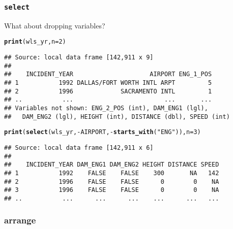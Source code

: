 \documentclass{beamer}\usepackage[]{graphicx}\usepackage[]{color}
\makeatletter
\newcommand{\hlnum}[1]{\textcolor[rgb]{0.686,0.059,0.569}{#1}}%
\newcommand{\hlstr}[1]{\textcolor[rgb]{0.192,0.494,0.8}{#1}}%
\newcommand{\hlopt}[1]{\textcolor[rgb]{0,0,0}{#1}}%
\newcommand{\hlstd}[1]{\textcolor[rgb]{0.345,0.345,0.345}{#1}}%
\newcommand{\hlkwc}[1]{\textcolor[rgb]{0.333,0.667,0.333}{#1}}%
\newcommand{\hlkwd}[1]{\textcolor[rgb]{0.737,0.353,0.396}{\textbf{#1}}}%
\newenvironment{kframe}{%
 \def\at@end@of@kframe{}%
 \ifinner\ifhmode%
  \def\at@end@of@kframe{\end{minipage}}%
  \begin{minipage}{\columnwidth}%
 \fi\fi%
 \def\FrameCommand##1{\hskip\@totalleftmargin \hskip-\fboxsep
 \colorbox{shadecolor}{##1}\hskip-\fboxsep
     \hskip-\linewidth \hskip-\@totalleftmargin \hskip\columnwidth}%
 \MakeFramed {\advance\hsize-\width
   \@totalleftmargin\z@ \linewidth\hsize
   \@setminipage}}%
 {\par\unskip\endMakeFramed%
 \at@end@of@kframe}
\newenvironment{knitrout}{}{} %
\makeatother
\begin{document}
\begin{frame}[fragile]
  \frametitle{{\tt select}}
  What about dropping variables?
\begin{knitrout}\footnotesize
{}\color{fgcolor}\begin{kframe}
\begin{alltt}
\hlkwd{print}\hlstd{(wls_yr,} \hlkwc{n} \hlstd{=} \hlnum{2}\hlstd{)}
\end{alltt}
\begin{verbatim}
## Source: local data frame [142,911 x 9]
## 
##    INCIDENT_YEAR                     AIRPORT ENG_1_POS
## 1           1992 DALLAS/FORT WORTH INTL ARPT         5
## 2           1996             SACRAMENTO INTL         1
## ..           ...                         ...       ...
## Variables not shown: ENG_2_POS (int), DAM_ENG1 (lgl),
##   DAM_ENG2 (lgl), HEIGHT (int), DISTANCE (dbl), SPEED (int)
\end{verbatim}
\begin{alltt}
\hlkwd{print}\hlstd{(}\hlkwd{select}\hlstd{(wls_yr,} \hlopt{-}\hlstd{AIRPORT,} \hlopt{-}\hlkwd{starts_with}\hlstd{(}\hlstr{"ENG"}\hlstd{)),} \hlkwc{n} \hlstd{=} \hlnum{3}\hlstd{)}
\end{alltt}
\begin{verbatim}
## Source: local data frame [142,911 x 6]
## 
##    INCIDENT_YEAR DAM_ENG1 DAM_ENG2 HEIGHT DISTANCE SPEED
## 1           1992    FALSE    FALSE    300       NA   142
## 2           1996    FALSE    FALSE      0        0    NA
## 3           1996    FALSE    FALSE      0        0    NA
## ..           ...      ...      ...    ...      ...   ...
\end{verbatim}
\end{kframe}
\end{knitrout}
\end{frame} 

\subsubsection{arrange}%
\end{document}
